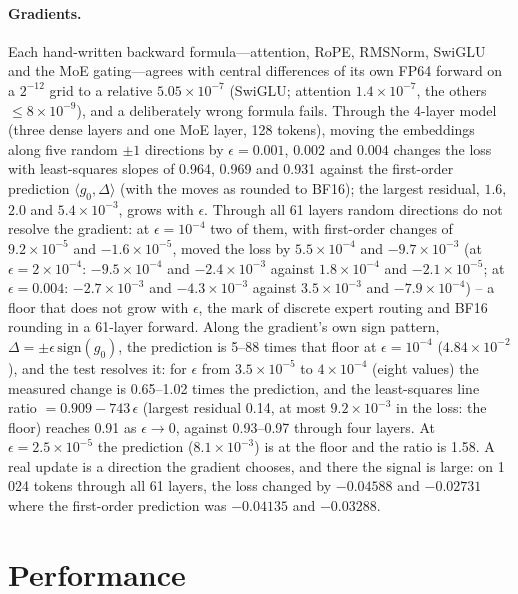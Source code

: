 \documentclass[11pt]{article}
\begin{document}
\paragraph{Gradients.} Each hand-written backward formula---attention, RoPE, RMSNorm, SwiGLU and the MoE gating---agrees with
central differences of its own FP64 forward on a $2^{-12}$ grid to a relative $5.05\times10^{-7}$ (SwiGLU; attention
$1.4\times10^{-7}$, the others $\le8\times10^{-9}$), and a deliberately wrong formula fails. Through the 4-layer model (three
dense layers and one MoE layer, 128 tokens), moving the embeddings along five random $\pm1$ directions by $\epsilon=0.001$,
$0.002$ and $0.004$ changes the loss with least-squares slopes of 0.964, 0.969 and 0.931 against the first-order prediction
$\langle g_0, \Delta\rangle$ (with the moves as rounded to BF16); the largest residual, $1.6$, $2.0$ and
$5.4\times10^{-3}$, grows with $\epsilon$. Through all 61 layers random directions do not resolve the gradient: at $\epsilon=10^{-4}$ two of them, with first-order
changes of $9.2\times10^{-5}$ and $-1.6\times10^{-5}$, moved the loss by $5.5\times10^{-4}$ and $-9.7\times10^{-3}$ (at
$\epsilon=2\times10^{-4}$: $-9.5\times10^{-4}$ and $-2.4\times10^{-3}$ against $1.8\times10^{-4}$ and $-2.1\times10^{-5}$; at
$\epsilon=0.004$: $-2.7\times10^{-3}$ and $-4.3\times10^{-3}$ against $3.5\times10^{-3}$ and $-7.9\times10^{-4}$) -- a floor
that does not grow with $\epsilon$, the mark of discrete expert routing and BF16 rounding in a 61-layer forward. Along the
gradient's own sign pattern, $\Delta=\pm\epsilon\,\mathrm{sign}(g_0)$, the prediction is 5--88 times that floor at
$\epsilon=10^{-4}$ ($4.84\times10^{-2}$), and the test resolves it: for $\epsilon$ from $3.5\times10^{-5}$ to $4\times10^{-4}$
(eight values) the measured change is 0.65--1.02 times the prediction, and the least-squares line ratio
$=0.909-743\,\epsilon$ (largest residual 0.14, at most $9.2\times10^{-3}$ in the loss: the floor) reaches 0.91 as
$\epsilon\to0$, against 0.93--0.97 through four layers. At $\epsilon=2.5\times10^{-5}$ the prediction ($8.1\times10^{-3}$) is
at the floor and the ratio is 1.58. A real update is a direction the gradient chooses,
and there the signal is large: on 1\,024 tokens through all 61 layers, the loss changed by $-0.04588$ and $-0.02731$ where the
first-order prediction was $-0.04135$ and $-0.03288$.

\section{Performance}\label{sec:perf}
\end{document}
